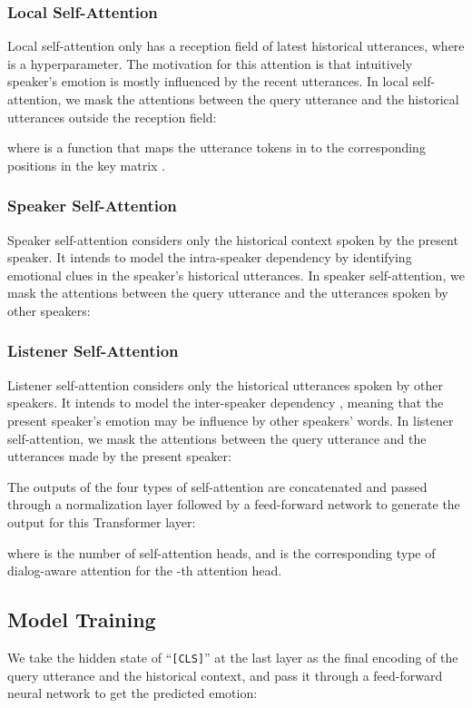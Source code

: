 \documentclass[letterpaper]{article} \usepackage{aaai21}  \usepackage{times}  \usepackage{helvet} \usepackage{courier}  \usepackage[hyphens]{url}  \usepackage{graphicx} \usepackage{amstext}
\begin{document}
\subsubsection{Local Self-Attention}
Local self-attention only has a reception field of  latest historical utterances, where  is a hyperparameter. The motivation for this attention is that intuitively speaker's emotion is mostly influenced by the recent utterances. In local self-attention, we mask the attentions between the query utterance and the historical utterances outside the reception field:

where  is a function that maps the utterance tokens in  to the corresponding positions in the key matrix  .

\subsubsection{Speaker Self-Attention}
Speaker self-attention considers only the historical context spoken by the present speaker. It intends to model the intra-speaker dependency \cite{ghosal2019dialoguegcn} by identifying emotional clues in the speaker's historical utterances. In speaker self-attention, we mask the attentions between the query utterance and the utterances spoken by other speakers:


\subsubsection{Listener Self-Attention}
Listener self-attention considers only the historical utterances spoken by other speakers. It intends to model the inter-speaker dependency \cite{ghosal2019dialoguegcn}, meaning that the present speaker's emotion may be influence by other speakers' words. In listener self-attention, we mask the attentions between the query utterance and the utterances made by the present speaker:


The outputs of the four types of self-attention are concatenated and passed through a normalization layer followed by a feed-forward network to generate the output for this Transformer layer:


where  is the number of self-attention heads, and  is the corresponding type of dialog-aware attention for the -th attention head.

\subsection{Model Training}
We take the hidden state of ``\texttt{[CLS]}'' at the last layer as the final encoding of the query utterance and the historical context, and pass it through a feed-forward neural network to get the predicted emotion:
\end{document}
